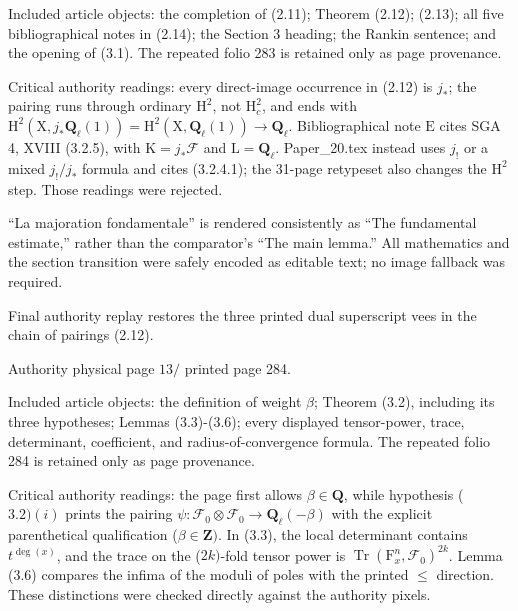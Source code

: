 \documentclass[10pt,leqno]{article}
\begin{document}
\noindent Included article objects: the completion of (2.11); Theorem (2.12); (2.13); all five bibliographical notes in (2.14); the Section 3 heading; the Rankin sentence; and the opening of (3.1). The repeated folio 283 is retained only as page provenance.\par

\noindent Critical authority readings: every direct-image occurrence in (2.12) is \(j_{*}\); the pairing runs through ordinary \(\mathrm{H}^{2}\), not \(\mathrm{H}_{c}^{2}\), and ends with \(\mathrm{H}^{2}(\mathrm{X},j_{*}\mathbf{Q}_{\ell }(1))=\mathrm{H}^{2}(\mathrm{X},\mathbf{Q}_{\ell }(1))\longrightarrow \mathbf{Q}_{\ell }\). Bibliographical note \(\mathrm{E}\) cites SGA 4, XVIII (3.2.5), with \(\mathrm{K}=j_{*}\mathcal{F} \) and \(\mathrm{L}=\mathbf{Q}_{\ell }\). Paper\_20.tex instead uses \(j_{!}\) or a mixed \(j_{!}/j_{*}\) formula and cites (3.2.4.1); the 31-page retypeset also changes the \(\mathrm{H}^{2}\) step. Those readings were rejected.\par

\noindent “La majoration fondamentale” is rendered consistently as “The fundamental estimate,” rather than the comparator’s “The main lemma.” All mathematics and the section transition were safely encoded as editable text; no image fallback was required.\par

\noindent Final authority replay restores the three printed dual superscript vees in the chain of pairings (2.12).\par

\clearpage

\label{physical-13}\par\smallskip

\noindent Authority physical page \(13 /\) printed page 284.\par

\noindent Included article objects: the definition of weight \(\beta \); Theorem (3.2), including its three hypotheses; Lemmas (3.3)-(3.6); every displayed tensor-power, trace, determinant, coefficient, and radius-of-convergence formula. The repeated folio 284 is retained only as page provenance.\par

\noindent Critical authority readings: the page first allows \(\beta \in \mathbf{Q}\), while hypothesis (\(3.2)(i)\) prints the pairing \(\psi :\mathcal{F} _{0}\otimes \mathcal{F} _{0}\longrightarrow \mathbf{Q}_{\ell }(- \beta )\) with the explicit parenthetical qualification (\(\beta \in \mathbf{Z})\). In (3.3), the local determinant contains \(t^{\operatorname{deg}(x)}\), and the trace on the (\(2k)\)-fold tensor power is \(\operatorname{Tr}(\mathrm{F}_{x}^{n},\mathcal{F} _{0})^{2k}\). Lemma (3.6) compares the infima of the moduli of poles with the printed \(\leq \) direction. These distinctions were checked directly against the authority pixels.\par
\end{document}
